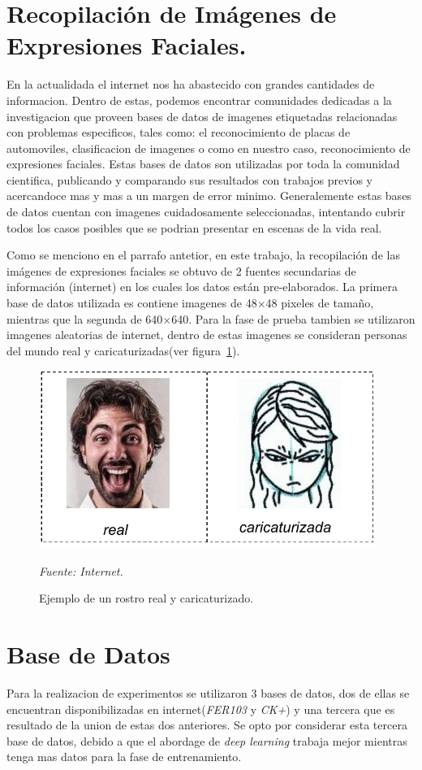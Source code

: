 \section{Recopilación de Imágenes de Expresiones Faciales.}
En la actualidada el internet nos ha abastecido con grandes cantidades de informacion. Dentro de estas, podemos encontrar comunidades dedicadas a la investigacion que proveen bases de datos de imagenes etiquetadas relacionadas con problemas especificos, tales como: el reconocimiento de placas de automoviles, clasificacion de imagenes o como en nuestro caso, reconocimiento de expresiones faciales. Estas bases de datos son utilizadas por toda la comunidad cientifica, publicando y comparando sus resultados con trabajos previos y acercandoce mas y mas a un margen de error minimo. Generalemente estas bases de datos cuentan con imagenes cuidadosamente seleccionadas, intentando cubrir todos los casos posibles que se podrian presentar en escenas de la vida real. 

Como se menciono en el parrafo antetior, en este trabajo, la recopilación de las imágenes de expresiones faciales se obtuvo de 2 fuentes secundarias de información (internet) en los cuales los datos están pre-elaborados. La primera base de datos utilizada es contiene imagenes de 48$\times$48 pixeles de tamaño, mientras que la segunda de 640$\times$640. Para la fase de prueba tambien se utilizaron imagenes aleatorias de internet, dentro de estas imagenes se consideran personas del mundo real y caricaturizadas(ver figura~\ref{fig:caricaturizado}).

\begin{figure}[H]
		\centering
		\includegraphics[width=110mm]{Imagenes/pruebas.pdf}
		\caption{Ejemplo de un rostro real y caricaturizado.}
		\vspace{0.15cm}
		\textit{Fuente: Internet.}
		\label{fig:caricaturizado}
\end{figure}

\section{Base de Datos}
Para la realizacion de experimentos se utilizaron 3 bases de datos, dos de ellas se encuentran disponibilizadas en internet(\textit{FER103} y \textit{CK+}) y una tercera que es resultado de la union de estas dos anteriores. Se opto por considerar esta tercera base de datos, debido a que el abordage de \textit{deep learning} trabaja mejor mientras tenga mas datos para la fase de entrenamiento.
 
